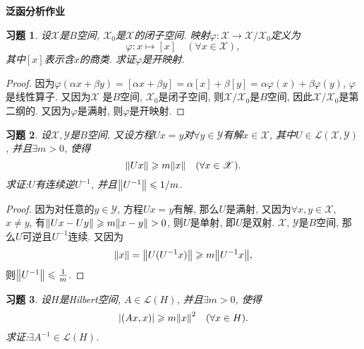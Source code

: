 \documentclass[a4paper,oneside,12pt]{ctexart}
\theoremstyle{plain}
\newtheorem{exercise}{习题}
\theoremstyle{nonumberplain}
\theoremstyle{nonumberplain}
\newtheorem{proof}{证明}
\newcommand{\sX}{\mathscr{X}}
\newcommand{\sY}{\mathscr{Y}}
\renewcommand{\phi}{\varphi}
\newcommand{\sL}{\mathscr{L}}
\begin{document}
    
    \begin{center}
        \bfseries\LARGE
        泛函分析作业
    \end{center}

    \begin{exercise}
        \label{ex:2.3.1}
        设$\sX$是$B$空间, $\sX_0$是$\sX$的闭子空间. 映射$\phi:\sX\to\sX/\sX_0$定义为 
        \begin{equation*}
            \phi:x\mapsto [x]\quad(\forall x\in\sX),
        \end{equation*}
        其中$[x]$表示含$x$的商类. 求证$\phi$是开映射.
    \end{exercise}

    \begin{proof}
        因为$\phi(\alpha x+\beta y)=[\alpha x+\beta y]=\alpha[x]+\beta[y]=\alpha\phi(x)+\beta\phi(y)$, $\phi$是线性算子. 又因为$\sX$
        是$B$空间, $\sX_0$是闭子空间, 则$\sX/\sX_0$是$B$空间, 因此$\sX/\sX_0$是第二纲的. 又因为$\phi$是满射, 则$\phi$是开映射.
    \end{proof}

    \begin{exercise}
        \label{ex:2.3.2}
        设$\sX,\sY$是$B$空间, 又设方程$Ux=y$对$\forall y\in\sY$有解$x\in\sX$, 其中$U\in\sL(\sX,\sY)$, 并且$\exists m>0$, 使得 
        \begin{equation*}
            \norm{Ux}\geqslant m\norm{x}\quad(\forall x\in\sX).
        \end{equation*}
        求证:$U$有连续逆$U^{-1}$, 并且$\norm{U^{-1}}\leqslant 1/m$. 
    \end{exercise}

    \begin{proof}
        因为对任意的$y\in\sY$, 方程$Ux=y$有解, 那么$U$是满射, 又因为$\forall x,y\in\sX$, $x\neq y$, 有$\norm{Ux-Uy}\geqslant m\norm{x-y}>0$, 
        则$U$是单射, 即$U$是双射. $\sX$, $\sY$是$B$空间, 那么$U$可逆且$U^{-1}$连续. 又因为 
        \begin{equation*}
            \norm{x}=\norm{U(U^{-1}x)}\geqslant m\norm{U^{-1}x},
        \end{equation*}
        则$\norm{U^{-1}}\leqslant \frac{1}{m}$.
    \end{proof}

    \begin{exercise}
        \label{ex:2.3.3}
        设$H$是Hilbert空间, $A\in\sL(H)$, 并且$\exists m>0$, 使得
        \begin{equation*}
            \abs{(Ax,x)}\geqslant m\norm{x}^2\quad(\forall x\in H).
        \end{equation*}
        求证:$\exists A^{-1}\in\sL(H)$.
    \end{exercise}
\end{document}
